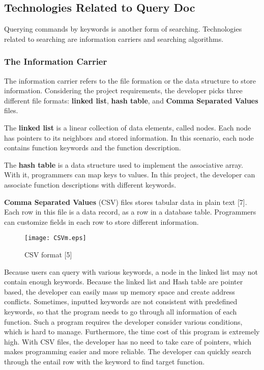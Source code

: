 \documentclass [10pt]{article}
\begin{document}
\subsection{Technologies Related to Query Doc}
Querying commands by keywords is another form of searching. Technologies related to searching are information carriers and searching algorithms. 
\subsubsection{The Information Carrier}
The information carrier refers to the file formation or the data structure to store information. Considering the project requirements, the developer picks three different file formats: \textbf{linked list}, \textbf{hash table}, and \textbf{Comma Separated Values} files.  \par
The \textbf{linked list} is a linear collection of data elements, called nodes. Each node has pointers to its neighbors and stored information. In this scenario, each node contains function keywords and the function description. \par
The \textbf{hash table} is a data structure used to implement the associative array. With it, programmers can map keys to values. In this project, the developer can associate function descriptions with different keywords.\par  
\textbf{Comma Separated Values} (CSV) files stores tabular data in plain text [7]. Each row in this file is a data record, as a row in a database table. Programmers can customize fields in each row to store different information.  \par
\begin{figure}[h]
\centering
\texttt{[image: CSVm.eps]}
\caption{CSV format [5]}
\end{figure}
Because users can query with various keywords, a node in the linked list may not contain enough keywords. Because the linked list and Hash table are pointer based, the developer can easily mass up memory space and create address conflicts. Sometimes, inputted keywords are not consistent with predefined keywords, so that the program needs to go through all information of each function. Such a program requires the developer consider various conditions, which is hard to manage. Furthermore, the time cost of this program is extremely high. With CSV files, the developer has no need to take care of pointers, which makes programming easier and more reliable. The developer can quickly search through the entail row with the keyword to find target function.  
\end{document}
